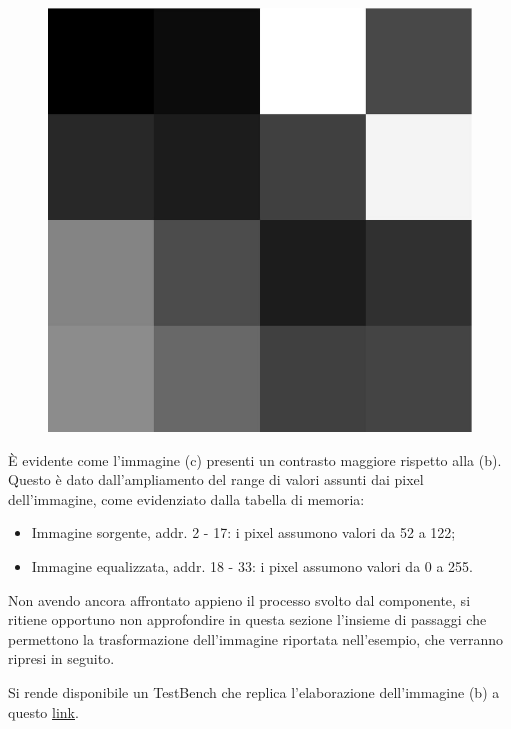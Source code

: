 \documentclass{article}
\begin{document}
\begin{figure}[ht]
\begin{minipage}[c]{.3\linewidth}
        \includegraphics[scale=0.25]{immElab.jpg}
        \label{esempio3}
    \end{minipage}
\end{figure}
\vspace{0.3cm}

È evidente come l'immagine \small (c) \normalsize presenti un contrasto maggiore rispetto alla \small(b)\normalsize. 
Questo è dato dall'ampliamento del range di valori assunti dai pixel dell'immagine, come evidenziato dalla tabella di memoria:
\begin{itemize}
    \item Immagine sorgente, addr. 2 - 17: i pixel assumono valori da 52 a 122;
    \item Immagine equalizzata, addr. 18 - 33: i pixel assumono valori da 0 a 255.
\end{itemize}

Non avendo ancora affrontato appieno il processo svolto dal componente, si ritiene opportuno non approfondire in questa sezione
l'insieme di passaggi che permettono la trasformazione dell'immagine riportata nell'esempio, che verranno ripresi in seguito. \par
Si rende disponibile un TestBench che replica l'elaborazione dell'immagine \small (b) \normalsize a questo \href{festadelsalame.com}{link}.
\end{document}
